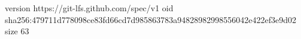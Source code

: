 version https://git-lfs.github.com/spec/v1
oid sha256:479711d778098ce83fd66cd7d985863783a94828982998556042e422ef3e9d02
size 63
